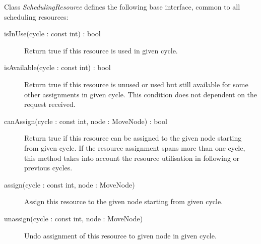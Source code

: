\documentclass[a4paper,twoside]{tce}
\begin{document}
Class \emph{SchedulingResource} defines the following base interface, common
to all scheduling resources:
\begin{description}
\item[isInUse(cycle : const int) : bool]%
  Return true if this resource is used in given cycle.

\item[isAvailable(cycle : const int) : bool]%
  Return true if this resource is unused or used but still available for some
  other assignments in given cycle. This condition does not dependent on the
  request received.

\item[canAssign(cycle : const int, node : MoveNode) : bool]%
  Return true if this resource can be assigned to the given node starting
  from given cycle. If the resource assignment spans more than one cycle,
  this method takes into account the resource utilisation in following or
  previous cycles.

\item[assign(cycle : const int, node : MoveNode)]%
  Assign this resource to the given node starting from given cycle.

\item[unassign(cycle : const int, node : MoveNode)]%
  Undo assignment of this resource to given node in given cycle.
\end{description}
\end{document}

